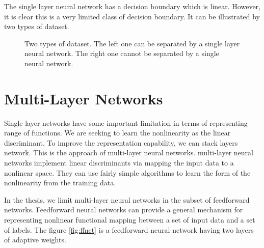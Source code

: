The single layer neural network has a decision boundary which is linear. However, it is clear this is a very limited class of decision boundary. It can be illustrated by two types of dataset.
\graphicspath{ {./Figures/} }
\begin{figure}[!htb]
\centering     %
{}
\caption{Two types of dataset. The left one can be separated by a single layer neural network. The right one cannot be separated by a single neural network.}
\end{figure}

\section{Multi-Layer Networks}

Single layer networks have some important limitation in terms of representing range of functions. We are seeking to learn the nonlinearity as the linear discriminant. To improve the representation capability, we can stack layers network. This is the approach of multi-layer neural networks. multi-layer neural networks implement linear discriminants via mapping the input data to a nonlinear space. They can use fairly simple algorithms to learn the form of the nonlinearity from the training data.

In the thesis, we limit multi-layer neural networks in the subset of feedforward networks. Feedforward neural networks can provide a general mechanism for representing nonlinear functional mapping between a set of input data and a set of labels. The figure \ref{fig:ffnet} is a feedforward neural network having two layers of adaptive weights.

